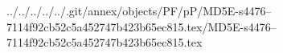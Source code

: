 ../../../../../.git/annex/objects/PF/pP/MD5E-s4476--7114f92cb52c5a452747b423b65ec815.tex/MD5E-s4476--7114f92cb52c5a452747b423b65ec815.tex